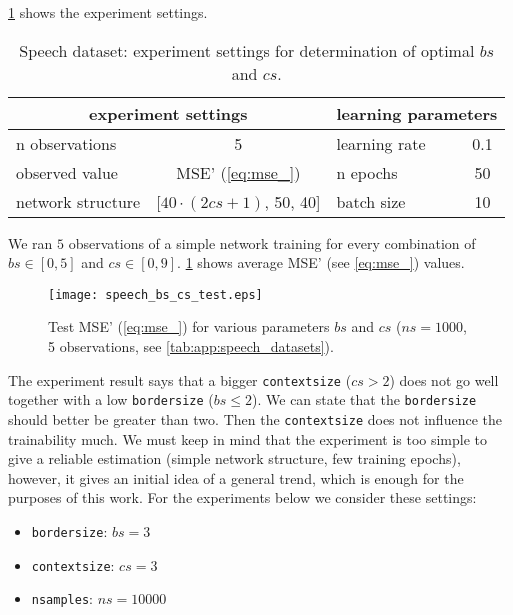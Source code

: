\cref{tab:examples:speech_bs_cs_determination} shows the experiment settings.

\begin{table}[H]
\centering
\begin{tabular}{|l|c|l|c|}
\hline
\multicolumn{2}{|c|}{experiment settings}   & \multicolumn{2}{c|}{learning parameters} \\ \hline
n observations    & 5                       & learning rate            & 0.1           \\ \hline
observed value    & MSE' (\cref{eq:mse_})    & n epochs                 & 50            \\ \hline
network structure & {[}$ 40 \cdot (2cs+1) $, 50, 40{]} & batch size               & 10            \\ \hline
\end{tabular}
\caption{Speech dataset: experiment settings for determination of optimal $ bs $ and $ cs $.}
\label{tab:examples:speech_bs_cs_determination}
\end{table}

We ran $ 5 $ observations of a simple network training for every combination of $ bs \in [0, 5] $ and $ cs \in [0, 9] $. \cref{fig:examples:speech_bs_cs_test} shows average MSE' (see \cref{eq:mse_}) values.

\begin{figure}[H]
\centering
\texttt{[image: speech\_bs\_cs\_test.eps]}
\caption{Test MSE' (\cref{eq:mse_}) for various parameters $ bs $ and $ cs $ ($ ns = 1000 $, 5 observations, see \cref{tab:app:speech_datasets}).}
\label{fig:examples:speech_bs_cs_test}
\end{figure}

The experiment result says that a bigger \texttt{context\textunderscore size} ($ cs > 2 $) does not go well together with a low \texttt{border\textunderscore size} ($ bs \leq 2 $). We can state that the \texttt{border\textunderscore size} should better be greater than two. Then the \texttt{context\textunderscore size} does not influence the trainability much. We must keep in mind that the experiment is too simple to give a reliable estimation (simple network structure, few training epochs), however, it gives an initial idea of a general trend, which is enough for the purposes of this work. For the experiments below we consider these settings:

\begin{itemize}
\item \texttt{border\textunderscore size}: $ bs = 3 $
\item \texttt{context\textunderscore size}: $ cs = 3 $
\item \texttt{n\textunderscore samples}: $ ns = 10000 $
\end{itemize}


